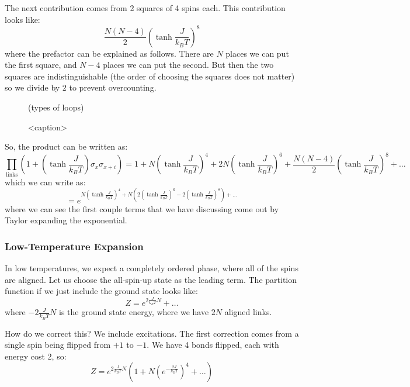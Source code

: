 The next contribution comes from 2 squares of 4 spins each. This contribution looks like:
\begin{equation}
    \frac{N(N-4)}{2}\left(\tanh\frac{J}{k_B T}\right)^8
\end{equation}
where the prefactor can be explained as follows. There are $N$ places we can put the first square, and $N-4$ places we can put the second. But then the two squares are indistinguishable (the order of choosing the squares does not matter) so we divide by $2$ to prevent overcounting. 

\begin{figure}[htbp]
    \centering
    (types of loops)
    \caption{<caption>}
    \label{<label>}
\end{figure}

So, the product can be written as:
\begin{equation}
    \prod_{\text{links}}\left(1 + (\tanh\frac{J}{k_B T})\sigma_x\sigma_{x + i}\right) = 1 + N\left(\tanh\frac{J}{k_B T}\right)^4 + 2N\left(\tanh\frac{J}{k_B T}\right)^6 + \frac{N(N-4)}{2}\left(\tanh\frac{J}{k_B T}\right)^8 + \ldots
\end{equation}
which we can write as:
\begin{equation}
    = e^{N\left(\tanh\frac{J}{k_B T}\right)^4 + N\left(2\left(\tanh\frac{J}{k_B T}\right)^6 - 2\left(\tanh\frac{J}{k_B T}\right)^8\right) + \ldots }
\end{equation}
where we can see the first couple terms that we have discussing come out by Taylor expanding the exponential.

\subsubsection{Low-Temperature Expansion}
In low temperatures, we expect a completely ordered phase, where all of the spins are aligned. Let us choose the all-spin-up state as the leading term. The partition function if we just include the ground state looks like:
\begin{equation}
    Z = e^{2\frac{J}{k_B T}N} + \ldots
\end{equation}
where $-2\frac{J}{k_B T}N$ is the ground state energy, where we have $2N$ aligned links.

How do we correct this? We include excitations. The first correction comes from a single spin being flipped from $+1$ to $-1$. We have 4 bonds flipped, each with energy cost 2, so:
\begin{equation}
    Z = e^{2\frac{J}{k_B T}N}\left(1 + N\left(e^{-\frac{2J}{k_B T}}\right)^4 + \ldots \right)
\end{equation}

